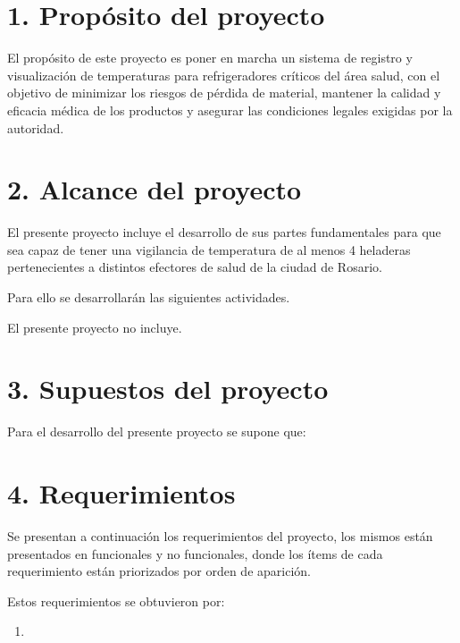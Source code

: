 \documentclass[11pt]{proyecto}
\begin{document}
\section{1. Propósito del proyecto}
\label{sec:proposito}


El propósito de este proyecto es poner en marcha un sistema de registro y visualización de temperaturas para refrigeradores críticos del área salud, con el objetivo de minimizar los riesgos de pérdida de material, mantener la calidad y eficacia médica de los productos y asegurar las condiciones legales exigidas por la autoridad.


\section{2. Alcance del proyecto}
\label{sec:alcance}


El presente proyecto incluye el desarrollo de sus partes fundamentales para que sea capaz de tener una vigilancia de temperatura de al menos 4 heladeras pertenecientes a distintos efectores de salud de la ciudad de Rosario. 

Para ello se desarrollarán las siguientes actividades.



El presente proyecto no incluye.




\section{3. Supuestos del proyecto}
\label{sec:supuestos}


Para el desarrollo del presente proyecto se supone que:



\section{4. Requerimientos}
\label{sec:requerimientos}


Se presentan a continuación los requerimientos del proyecto, los mismos están presentados en funcionales y no funcionales, donde los ítems de cada requerimiento están priorizados por orden de aparición.

Estos requerimientos se obtuvieron por:

\begin{enumerate}
\item 
		
\end{enumerate}
\end{document}
